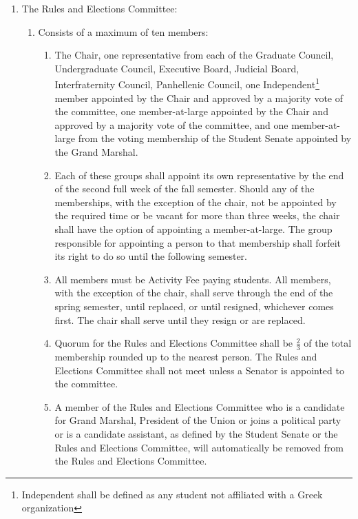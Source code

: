 \documentclass{bylaws}
\begin{document}
\begin{enumerate}
\item The Rules and Elections Committee:
\begin{enumerate}
\item Consists of a maximum of ten members:
\begin{enumerate}
\item The Chair, one representative from each of the Graduate Council, Undergraduate Council, Executive Board, Judicial
Board, Interfraternity Council, Panhellenic Council, one Independent\footnote{Independent shall be defined as any student not affiliated with a Greek organization} member appointed by the Chair and approved
by a majority vote of the committee, one member-at-large appointed by the Chair and approved by a majority vote of
the committee, and one member-at-large from the voting membership of the Student Senate appointed by the Grand
Marshal.
\item Each of these groups shall appoint its own representative by the end of the second full week of the fall semester.
Should any of the memberships, with the exception of the chair, not be appointed by the required time or be vacant
for more than three weeks, the chair shall have the option of appointing a member-at-large. The group responsible for
appointing a person to that membership shall forfeit its right to do so until the following semester.
\item All members must be Activity Fee paying students. All members, with the exception of the chair, shall serve through
the end of the spring semester, until replaced, or until resigned, whichever comes first. The chair shall serve until they
resign or are replaced.
\item Quorum for the Rules and Elections Committee shall be $\frac{2}{3}$ of the total membership rounded up to the nearest
person. The Rules and Elections Committee shall not meet unless a Senator is appointed to the committee.
\item A member of the Rules and Elections Committee who is a candidate for Grand Marshal, President of the Union or
joins a political party or is a candidate assistant, as defined by the Student Senate or the Rules and Elections
Committee, will automatically be removed from the Rules and Elections Committee.
\end{enumerate}


\end{enumerate}
\end{enumerate}
\end{document}
